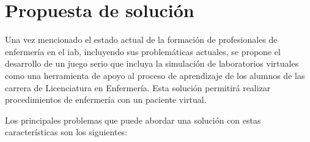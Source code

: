 
\section{Propuesta de solución}

Una vez mencionado el estado actual de la formación de profesionales de
enfermería en el \Gls{iab}, incluyendo sus problemáticas actuales, 
se propone 
el desarrollo de un juego serio que incluya la simulación
de laboratorios virtuales como una herramienta de apoyo al
proceso de aprendizaje de los alumnos de las carrera de
Licenciatura en Enfermería. Esta solución permitirá realizar procedimientos de 
enfermería con un paciente virtual.

Los principales problemas que puede abordar una solución con estas
características son los siguientes:


